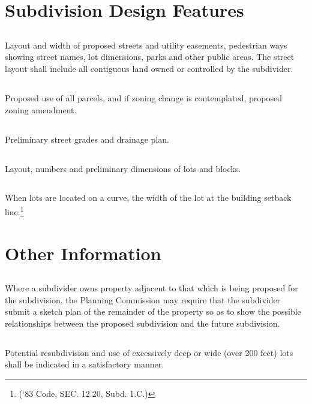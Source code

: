 \section{Subdivision Design Features}
\subsection{}
Layout and width of proposed streets and utility easements, pedestrian ways showing street names, lot dimensions, parks and other public areas. The street layout shall include all contiguous land owned or controlled by the subdivider.
\subsection{}
Proposed use of all parcels, and if zoning change is contemplated, proposed zoning amendment.
\subsection{}
Preliminary street grades and drainage plan.
\subsection{}
Layout, numbers and preliminary dimensions of lots and blocks.
\subsection{}
When lots are located on a curve, the width of the lot at the building setback line.\footnote{(‘83 Code, SEC. 12.20, Subd. 1.C.)}
\section{Other Information}
\subsection{}
Where a subdivider owns property adjacent to that which is being proposed for the subdivision, the Planning Commission may require that the subdivider submit a sketch plan of the remainder of the property so as to show the possible relationships between the proposed subdivision and the future subdivision.
\subsection{}
Potential resubdivision and use of excessively deep or wide (over 200 feet) lots shall be indicated in a satisfactory manner.
